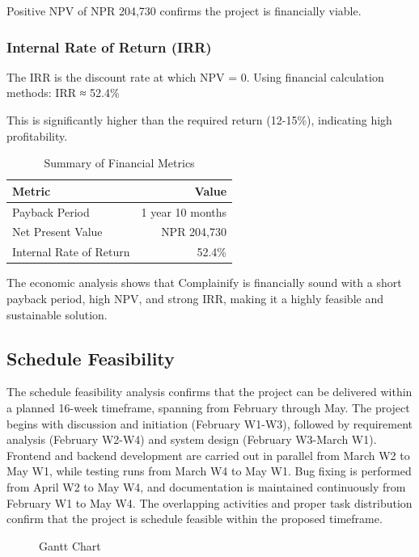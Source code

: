 \documentclass[12pt,a4paper]{report}
\begin{document}
Positive NPV of NPR 204,730 confirms the project is financially viable.

\subsubsection{Internal Rate of Return (IRR)}
The IRR is the discount rate at which NPV = 0. Using financial calculation methods:
IRR ≈ 52.4\%

This is significantly higher than the required return (12-15\%), indicating high profitability.

\begin{table}[H]
\centering
\caption{Summary of Financial Metrics}
\begin{tabular}{lr}
\toprule
\textbf{Metric} & \textbf{Value} \\
\midrule
Payback Period & 1 year 10 months \\
Net Present Value & NPR 204,730 \\
Internal Rate of Return & 52.4\% \\
\bottomrule
\end{tabular}
\end{table}

The economic analysis shows that Complainify is financially sound with a short payback period, high NPV, and strong IRR, making it a highly feasible and sustainable solution.

\subsection{Schedule Feasibility}
The schedule feasibility analysis confirms that the project can be delivered within a planned 16-week timeframe, spanning from February through May. The project begins with discussion and initiation (February W1-W3), followed by requirement analysis (February W2-W4) and system design (February W3-March W1). Frontend and backend development are carried out in parallel from March W2 to May W1, while testing runs from March W4 to May W1. Bug fixing is performed from April W2 to May W4, and documentation is maintained continuously from February W1 to May W4. The overlapping activities and proper task distribution confirm that the project is schedule feasible within the proposed timeframe.

\begin{figure}[H]
\centering
{}
\caption{Gantt Chart}
\end{figure}
\end{document}
